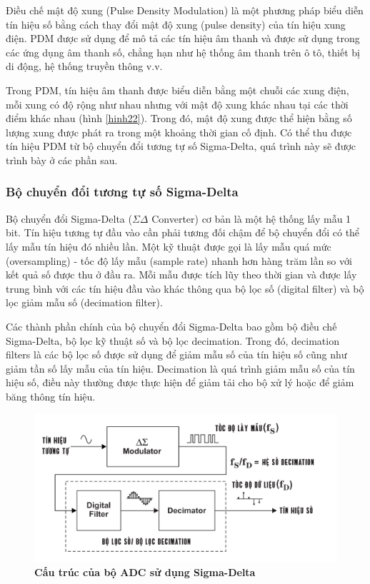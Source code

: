 Điều chế mật độ xung (Pulse Density Modulation) là một phương pháp biểu diễn tín hiệu số bằng cách thay đổi mật độ xung (pulse density) của tín hiệu xung điện. PDM được sử dụng để mô tả các tín hiệu âm thanh và được sử dụng trong các ứng dụng âm thanh số, chẳng hạn như hệ thống âm thanh trên ô tô, thiết bị di động, hệ thống truyền thông v.v.

Trong PDM, tín hiệu âm thanh được biểu diễn bằng một chuỗi các xung điện, mỗi xung có độ rộng như nhau nhưng với mật độ xung khác nhau tại các thời điểm khác nhau (hình \ref{hinh22}). Trong đó, mật độ xung được thể hiện bằng số lượng xung được phát ra trong một khoảng thời gian cố định. Có thể thu được tín hiệu PDM từ bộ chuyển đổi tương tự số Sigma-Delta, quá trình này sẽ được trình bày ở các phần sau.

\subsubsection{Bộ chuyển đổi tương tự số Sigma-Delta}
Bộ chuyển đổi Sigma-Delta ($\Sigma\Delta$ Converter) cơ bản là một hệ thống lấy mẫu 1 bit. Tín hiệu tương tự đầu vào cần phải tương đối chậm để bộ chuyển đổi có thể lấy mẫu tín hiệu đó nhiều lần. Một kỹ thuật được gọi là lấy mẫu quá mức (oversampling) - tốc độ lấy mẫu (sample rate) nhanh hơn hàng trăm lần so với kết quả số được thu ở đầu ra. Mỗi mẫu được tích lũy theo thời gian và được lấy trung bình với các tín hiệu đầu vào khác thông qua bộ lọc số (digital filter) và bộ lọc giảm mẫu số (decimation filter).\cite{8227915}

Các thành phần chính của bộ chuyển đổi Sigma-Delta bao gồm bộ điều chế Sigma-Delta, bộ lọc kỹ thuật số và bộ lọc decimation. Trong đó, decimation filters là các bộ lọc số được sử dụng để giảm mẫu số của tín hiệu số cũng như giảm tần số lấy mẫu của tín hiệu. Decimation là quá trình giảm mẫu số của tín hiệu số, điều này thường được thực hiện để giảm tải cho bộ xử lý hoặc để giảm băng thông tín hiệu. 
\begin{figure}[!ht]
    \centering
    \includegraphics[width=12cm]{Images/Chuong2/DAC-SD.png}
    \caption[Cấu trúc của bộ ADC sử dụng Sigma-Delta]{\bfseries \fontsize{12pt}{0pt}\selectfont Cấu trúc của bộ ADC sử dụng Sigma-Delta}
    \label{hinh23}
\end{figure}

